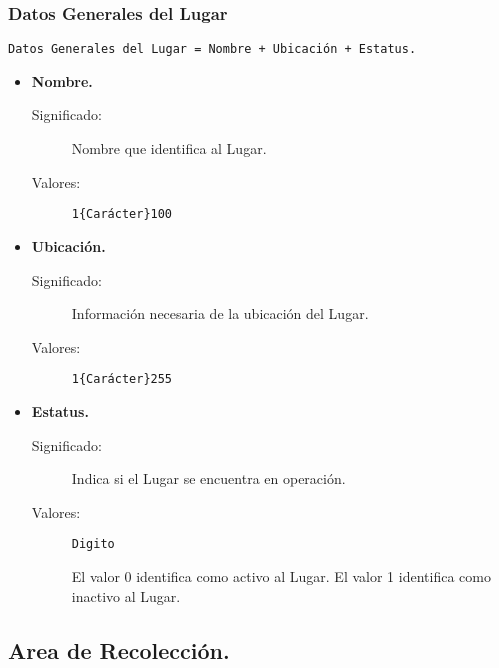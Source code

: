 \subsubsection{Datos Generales del Lugar}\label{Datos_Estacion_Transferencia}\label{Datos_PlantaComposta}\label{Datos_SitioDisposicion}\label{Datos_CentroAcopio}\label{Datos_PuntoEspecifico}\label{Datos_Generales}\label{Datos_Planta_Seleccion}\label{Datos_TiraderoClandestino}
 \lstset{breaklines=false}
\begin{lstlisting}
Datos Generales del Lugar = Nombre + Ubicación + Estatus.
\end{lstlisting}
\lstset{breaklines=true}
	\begin{itemize}
		\item \textbf{Nombre.}
			\begin{description}
				\item [Significado:] Nombre que identifica al Lugar.
				\item [Valores:]{\begin{lstlisting}
1{Carácter}100\end{lstlisting}}
			\end{description}
		\item \textbf{Ubicación.}
			\begin{description}
				\item [Significado:] Información necesaria de la ubicación del Lugar.
				\item [Valores:]{\begin{lstlisting}
1{Carácter}255\end{lstlisting}}
			\end{description}
		\item \textbf{Estatus.}
			\begin{description}
				\item [Significado:] Indica si el Lugar se encuentra en operación.
				\item [Valores:]{\begin{lstlisting}
Digito\end{lstlisting}}
					\subitem El valor 0 identifica como activo al Lugar.
					\subitem El valor 1 identifica como inactivo al Lugar.
			\end{description}
	\end{itemize}

\subsection{Area de Recolección.}

